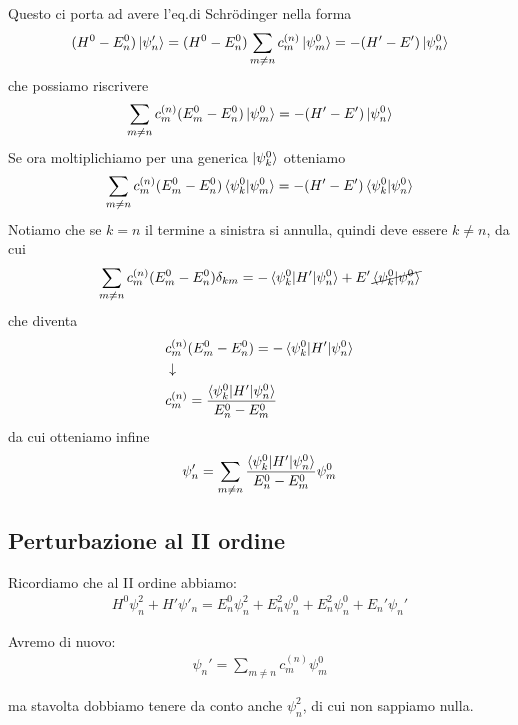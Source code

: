 Questo ci porta ad avere l'eq.di Schrödinger nella forma
\begin{align}
(H^0 - E^0_n)\ket{\psi_n'} = (H^0 - E^0_n)\sum_{m\neq n}c_m^{(n)}\ket{\psi_m^0} = -(H'-E')\ket{\psi_n^0}
\end{align}
che possiamo riscrivere
\begin{align}
\sum_{m\neq n}c_m^{(n)} (E_m^0 - E^0_n) \ket{\psi_m^0} = -(H'-E')\ket{\psi_n^0}
\end{align}
Se ora moltiplichiamo per una generica $\ket{\psi_k^0}$ otteniamo
\begin{align}
\sum_{m\neq n}c_m^{(n)} (E_m^0 - E^0_n) \braket{\psi_k^0|\psi_m^0} = -(H'-E')\braket{\psi_k^0|\psi_n^0}
\end{align}
Notiamo che se $k=n$ il termine a sinistra si annulla, quindi deve essere $k\neq n$, da cui
\begin{align}
\sum_{m\neq n}c_m^{(n)} (E_m^0 - E^0_n)\delta_{km} = -\braket{\psi_k^0|H'|\psi_n^0} +E'\, \cancel{\braket{\psi_k^0|\psi_n^0}}
\end{align}
che diventa
\begin{align}
{}&c_m^{(n)} (E_m^0 - E^0_n) = -\braket{\psi_k^0|H'|\psi_n^0}\\
&\downarrow \nonumber \\
\label{eq:eq0}
& c_m^{(n)}  = \frac{\braket{\psi_k^0|H'|\psi_n^0}}{E_n^0 - E^0_m}
\end{align}
da cui otteniamo infine
\begin{align}
\psi_n'= \sum_{m\neq n} \frac{\braket{\psi_k^0|H'|\psi_n^0}}{E_n^0 - E^0_m} \psi_m^0
\end{align}

\subsection{Perturbazione al II ordine}

Ricordiamo che al II ordine abbiamo:
\begin{align}
         \label{eq:eq1}
H^0\psi^2_n + H'\psi'_n=E^0_n \psi^2_n + E^2_n \psi_n^0 + E_n^2\psi_n^0 + E_n'\psi_n'
\end{align}

Avremo di nuovo:
\begin{align}
\label{eq:eq2}
\psi_n'= \sum_{m\neq n}c_m^{(n)}\psi_m^0
\end{align}

ma stavolta dobbiamo tenere da conto anche $\psi_n^2$, di cui non sappiamo nulla.

